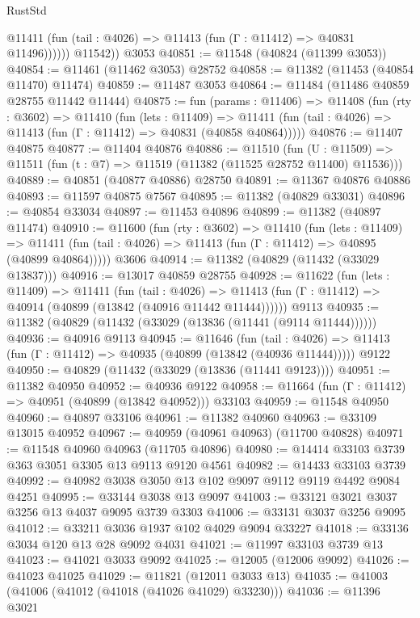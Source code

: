\begin{lexlean}{RustStd}
\begin{coremodule}
              @11411 (fun (tail : @4026) => @11413 (fun (Γ : @11412) => @40831 @11496))))))
        @11542))
    @3053
@40851 := @11548 (@40824 (@11399 @3053))
@40854 := @11461 (@11462 @3053) @28752
@40858 := @11382 (@11453 (@40854 @11470) @11474)
@40859 := @11487 @3053
@40864 := @11484 (@11486 @40859 @28755 @11442 @11444)
@40875 := fun (params : @11406) =>
  @11408
    (fun (rty : @3602) =>
    @11410
      (fun (lets : @11409) =>
      @11411 (fun (tail : @4026) => @11413 (fun (Γ : @11412) => @40831 (@40858 @40864)))))
@40876 := @11407 @40875
@40877 := @11404 @40876
@40886 := @11510
    (fun (U : @11509) => @11511 (fun (t : @7) => @11519 (@11382 (@11525 @28752 @11400) @11536)))
@40889 := @40851 (@40877 @40886) @28750
@40891 := @11367 @40876 @40886
@40893 := @11597 @40875 @7567
@40895 := @11382 (@40829 @33031)
@40896 := @40854 @33034
@40897 := @11453 @40896
@40899 := @11382 (@40897 @11474)
@40910 := @11600
    (fun (rty : @3602) =>
    @11410
      (fun (lets : @11409) =>
      @11411 (fun (tail : @4026) => @11413 (fun (Γ : @11412) => @40895 (@40899 @40864)))))
    @3606
@40914 := @11382 (@40829 (@11432 (@33029 @13837)))
@40916 := @13017 @40859 @28755
@40928 := @11622
    (fun (lets : @11409) =>
    @11411
      (fun (tail : @4026) =>
      @11413 (fun (Γ : @11412) => @40914 (@40899 (@13842 (@40916 @11442 @11444))))))
    @9113
@40935 := @11382 (@40829 (@11432 (@33029 (@13836 (@11441 (@9114 @11444))))))
@40936 := @40916 @9113
@40945 := @11646
    (fun (tail : @4026) => @11413 (fun (Γ : @11412) => @40935 (@40899 (@13842 (@40936 @11444)))))
    @9122
@40950 := @40829 (@11432 (@33029 (@13836 (@11441 @9123))))
@40951 := @11382 @40950
@40952 := @40936 @9122
@40958 := @11664 (fun (Γ : @11412) => @40951 (@40899 (@13842 @40952))) @33103
@40959 := @11548 @40950
@40960 := @40897 @33106
@40961 := @11382 @40960
@40963 := @33109 @13015 @40952
@40967 := @40959 (@40961 @40963) (@11700 @40828)
@40971 := @11548 @40960 @40963 (@11705 @40896)
@40980 := @14414 @33103 @3739 @363 @3051 @3305 @13 @9113 @9120 @4561
@40982 := @14433 @33103 @3739
@40992 := @40982 @3038 @3050 @13 @102 @9097 @9112 @9119 @4492 @9084 @4251
@40995 := @33144 @3038 @13 @9097
@41003 := @33121 @3021 @3037 @3256 @13 @4037 @9095 @3739 @3303
@41006 := @33131 @3037 @3256 @9095
@41012 := @33211 @3036 @1937 @102 @4029 @9094 @33227
@41018 := @33136 @3034 @120 @13 @28 @9092 @4031
@41021 := @11997 @33103 @3739 @13
@41023 := @41021 @3033 @9092
@41025 := @12005 (@12006 @9092)
@41026 := @41023 @41025
@41029 := @11821 (@12011 @3033 @13)
@41035 := @41003 (@41006 (@41012 (@41018 (@41026 @41029) @33230)))
@41036 := @11396 @3021

\end{coremodule}
\end{lexlean}
